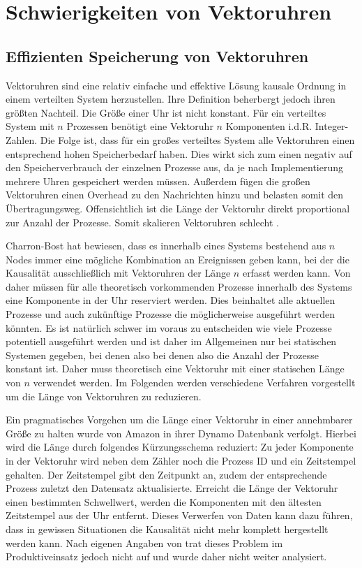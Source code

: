 \section{Schwierigkeiten von Vektoruhren}
\label{cap:problemeVC}
\subsection{Effizienten Speicherung von Vektoruhren}
Vektoruhren sind eine relativ einfache und effektive Lösung kausale Ordnung in einem verteilten System herzustellen.
Ihre Definition beherbergt jedoch ihren größten Nachteil.
Die Größe einer Uhr ist nicht konstant.
Für ein verteiltes System mit $n$ Prozessen benötigt eine Vektoruhr $n$ Komponenten i.d.R. Integer-Zahlen.
Die Folge ist, dass für ein großes verteiltes System alle Vektoruhren einen entsprechend hohen Speicherbedarf haben.
Dies wirkt sich zum einen negativ auf den Speicherverbrauch der einzelnen Prozesse aus, da je nach Implementierung mehrere Uhren gespeichert werden müssen.
Außerdem fügen die großen Vektoruhren einen Overhead zu den Nachrichten hinzu und belasten somit den Übertragungsweg.
Offensichtlich ist die Länge der Vektoruhr direkt proportional zur Anzahl der Prozesse.
Somit skalieren Vektoruhren schlecht \cite{torres1999plausible}.

Charron-Bost \cite{charron1990concerning} hat bewiesen, dass es innerhalb eines Systems bestehend aus $n$ Nodes immer eine mögliche Kombination an Ereignissen geben kann, bei der die Kausalität ausschließlich mit Vektoruhren der Länge $n$ erfasst werden kann.
Von daher müssen für alle theoretisch vorkommenden Prozesse innerhalb des Systems eine Komponente in der Uhr reserviert werden.
Dies beinhaltet alle aktuellen Prozesse und auch zukünftige Prozesse die möglicherweise ausgeführt werden könnten.
Es ist natürlich schwer im voraus zu entscheiden wie viele Prozesse potentiell ausgeführt werden und ist daher im Allgemeinen nur bei statischen Systemen gegeben, bei denen also  bei denen also die Anzahl der Prozesse konstant ist.
Daher muss theoretisch eine Vektoruhr mit einer statischen Länge von $n$ verwendet werden.
Im Folgenden werden verschiedene Verfahren vorgestellt um die Länge von Vektoruhren zu reduzieren.

Ein pragmatisches Vorgehen um die Länge einer Vektoruhr in einer annehmbarer Größe zu halten wurde von Amazon in ihrer Dynamo Datenbank \cite{decandia2007dynamo} verfolgt.
Hierbei wird die Länge durch folgendes Kürzungsschema reduziert:
Zu jeder Komponente in der Vektoruhr wird neben dem Zähler noch die Prozess ID und ein Zeitstempel gehalten.
Der Zeitstempel gibt den Zeitpunkt an, zudem der entsprechende Prozess zuletzt den Datensatz aktualisierte.
Erreicht die Länge der Vektoruhr einen bestimmten Schwellwert, werden die Komponenten mit den ältesten Zeitstempel aus der Uhr entfernt.
Dieses Verwerfen von Daten kann dazu führen, dass in gewissen Situationen die Kausalität nicht mehr komplett hergestellt werden kann.
Nach eigenen Angaben von  \cite{decandia2007dynamo} trat dieses Problem im Produktiveinsatz jedoch nicht auf und wurde daher nicht weiter analysiert.

